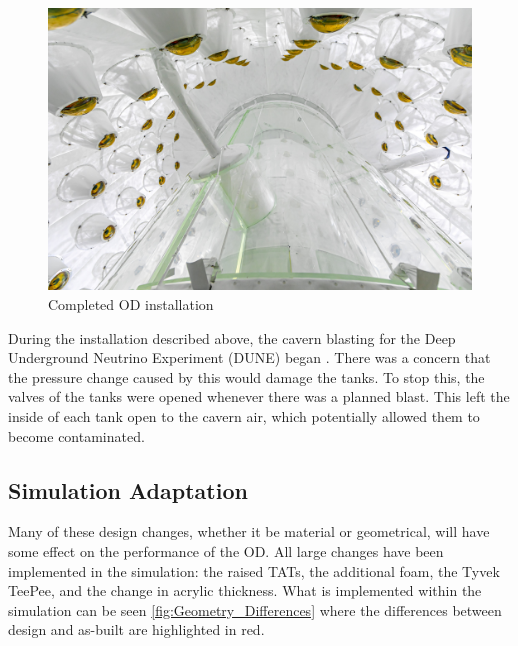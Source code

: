 \begin{figure}[]
\includegraphics[width=\textwidth]{Figures/Construction/od_complete.jpg}
\centering
\caption{Completed OD installation}
\label{fig:complete_od}
\end{figure}

\par
During the installation described above, the cavern blasting for the Deep Underground Neutrino Experiment (DUNE) began \cite{dune_blasting_ref}.
There was a concern that the pressure change caused by this would damage the tanks.
To stop this, the valves of the tanks were opened whenever there was a planned blast.
This left the inside of each tank open to the cavern air, which potentially allowed them to become contaminated.


\subsection{Simulation Adaptation}
\par
Many of these design changes, whether it be material or geometrical, will have some effect on the performance of the OD.
All large changes have been implemented in the simulation: the raised TATs, the additional foam, the Tyvek TeePee, and the change in acrylic thickness.
What is implemented within the simulation can be seen \autoref{fig:Geometry_Differences} where the differences between design and as-built are highlighted in red.


